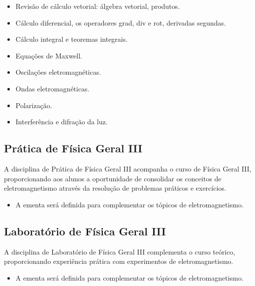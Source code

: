 \documentclass[a4paper, 12pt]{article}
\newcounter{fis}
\begin{document}
\begin{tcolorbox}[title=Ementa Física Geral IIIb:]
    \begin{itemize}
        \item Revisão de cálculo vetorial: álgebra vetorial, produtos.
        \item Cálculo diferencial, os operadores grad, div e rot, derivadas segundas.
        \item Cálculo integral e teoremas integrais.
        \item Equações de Maxwell.
        \item Oscilações eletromagnéticas.
        \item Ondas eletromagnéticas.
        \item Polarização.
        \item Interferência e difração da luz.
    \end{itemize}
\end{tcolorbox}

\subsection{Prática de Física Geral III}
\label{fis009}

A disciplina de Prática de Física Geral III acompanha o curso de Física Geral III,
proporcionando aos alunos a oportunidade de consolidar os conceitos de eletromagnetismo
através da resolução de problemas práticos e exercícios.

\begin{tcolorbox}[title=Ementa:]
    \begin{itemize}
        \item A ementa será definida para complementar os tópicos de eletromagnetismo.
    \end{itemize}
\end{tcolorbox}

\subsection{Laboratório de Física Geral III}
\label{fis010}

A disciplina de Laboratório de Física Geral III complementa o curso teórico,
proporcionando experiência prática com experimentos de eletromagnetismo.

\begin{tcolorbox}[title=Ementa:]
    \begin{itemize}
        \item A ementa será definida para complementar os tópicos de eletromagnetismo.
    \end{itemize}
\end{tcolorbox}
\end{document}
